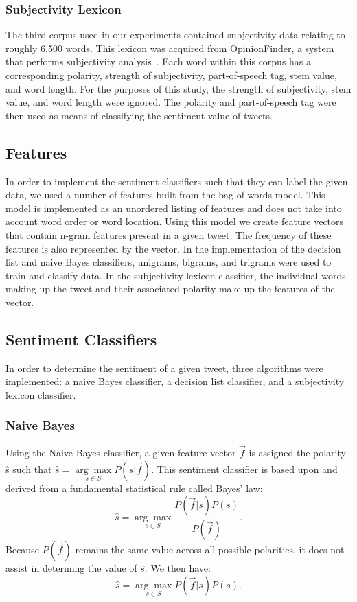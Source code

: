 \documentclass[11pt]{article}
\begin{document}
\subsubsection*{Subjectivity Lexicon}
The third corpus used in our experiments contained subjectivity data relating to roughly 6,500 words. This lexicon was acquired from OpinionFinder, a system that performs subjectivity analysis~\cite{wilson2005opinionfinder}. Each word within this corpus has a corresponding polarity, strength of subjectivity, part-of-speech tag, stem value, and word length. For the purposes of this study, the strength of subjectivity, stem value, and word length were ignored. The polarity and part-of-speech tag were then used as means of classifying the sentiment value of tweets.

\subsection{Features}
In order to implement the sentiment classifiers such that they can label the given data, we used a number of features built from the bag-of-words model. This model is implemented as an unordered listing of features and does not take into account word order or word location. Using this model we create feature vectors that contain n-gram features present in a given tweet. The frequency of these features is also represented by the vector. In the implementation of the decision list and naive Bayes classifiers, unigrams, bigrams, and trigrams were used to train and classify data. In the subjectivity lexicon classifier, the individual words making up the tweet and their associated polarity make up the features of the vector. 

\subsection{Sentiment Classifiers}
In order to determine the sentiment of a given tweet, three algorithms were implemented: a naive Bayes classifier, a decision list classifier, and a subjectivity lexicon classifier.
\subsubsection*{Naive Bayes}
Using the Naive Bayes classifier, a given feature vector $\vec{f}$ is assigned
the polarity \^{s} such that 
$\hat{s} = \underset{{s}\in{S}}{\arg\max}P(s|\vec{f})$. This sentiment 
classifier is based upon and derived from a fundamental statistical rule 
called Bayes' law:
\[\hat{s} = \underset{{s}\in{S}}{\arg\max}{\frac{P(\vec{f}|s)P(s)}{P(\vec{f})}}.\]
Because $P(\vec{f})$ remains the same value across all possible polarities, it
does not assist in determing the value of $\hat{s}$. We then have:
\[\hat{s} = \underset{{s}\in{S}}{\arg\max}{P(\vec{f}|s)P(s)}.\]
\end{document}
